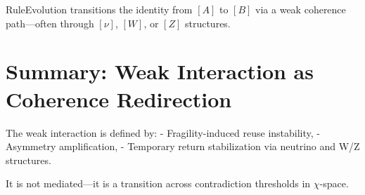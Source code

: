 RuleEvolution transitions the identity from $[A]$ to $[B]$ via a weak coherence path—often through $[\nu]$, $[W]$, or $[Z]$ structures.

\section{Summary: Weak Interaction as Coherence Redirection} \label{sec:weak-summary}

The weak interaction is defined by:
- Fragility-induced reuse instability,
- Asymmetry amplification,
- Temporary return stabilization via neutrino and W/Z structures.

It is not mediated—it is a transition across contradiction thresholds in $\chi$-space.

